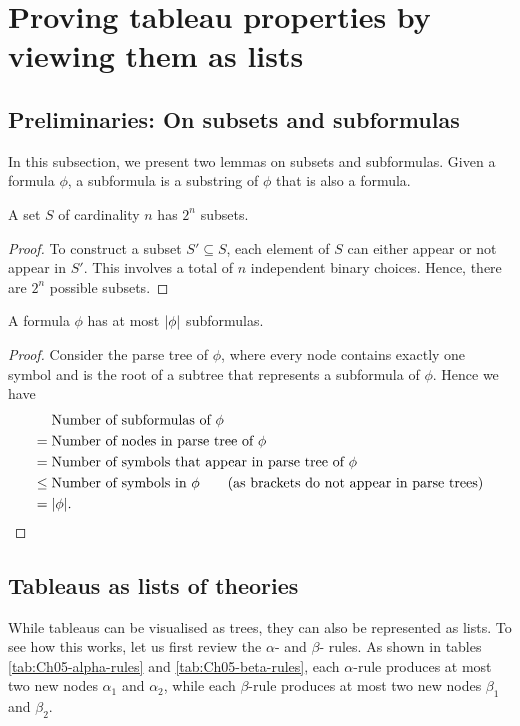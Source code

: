 \section{Proving tableau properties by viewing them as lists}

\subsection{Preliminaries: On subsets and subformulas}

In this subsection, we present two lemmas on subsets and subformulas. Given a formula \(\phi\), a subformula is a substring of \(\phi\) that is also a formula.

\begin{lemma}
    A set \(S\) of cardinality \(n\) has \(2^n\) subsets.
\end{lemma}
\begin{proof}
    To construct a subset \(S' \subseteq S\), each element of \(S\) can either appear or not appear in \(S'\). This involves a total of \(n\) independent binary choices. Hence, there are \(2^n\) possible subsets.
\end{proof}

\begin{lemma}
    A formula \(\phi\) has at most \(|\phi|\) subformulas.
\end{lemma}
\begin{proof}
    Consider the parse tree of \(\phi\), where every node contains exactly one symbol and is the root of a subtree that represents a subformula of \(\phi\). Hence we have
    \begin{align*}
        & \text{Number of subformulas of } \phi\\
        =\;& \text{Number of nodes in parse tree of } \phi\\
        =\;& \text{Number of symbols that appear in parse tree of } \phi\\
        \leq\;& \text{Number of symbols in } \phi \tag{as brackets do not appear in parse trees}\\
        =\;& |\phi|\text{.} \qedhere
    \end{align*}
\end{proof}

\subsection{Tableaus as lists of theories}

While tableaus can be visualised as trees, they can also be represented as lists. To see how this works, let us first review the \(\alpha\)- and \(\beta\)- rules. As shown in tables \ref{tab:Ch05-alpha-rules} and \ref{tab:Ch05-beta-rules}, each \(\alpha\)-rule produces at most two new nodes \(\alpha_1\) and \(\alpha_2\), while each \(\beta\)-rule produces at most two new nodes \(\beta_1\) and \(\beta_2\).

